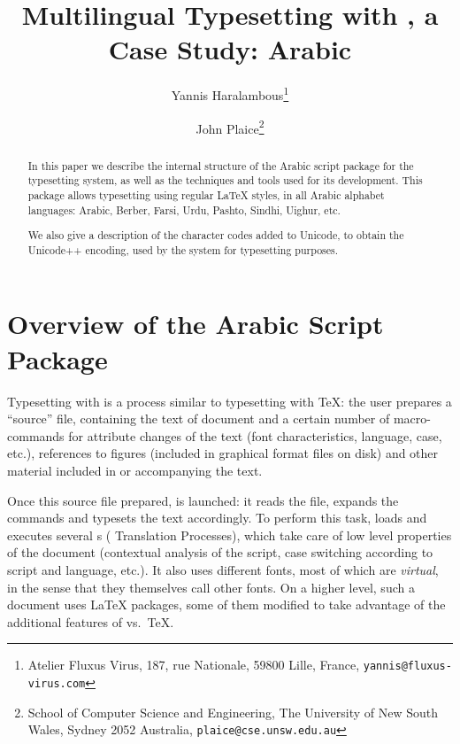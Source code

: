\documentclass[a4paper,11pt]{article}
\begin{document}
\setcounter{page}{63}
\title{Multilingual Typesetting with \OMEGA, a Case Study: Arabic}
\author{Yannis Haralambous\thanks{Atelier Fluxus Virus, 187, rue Nationale,
59800 Lille, France, \texttt{yannis@fluxus-virus.com}}
\and
John Plaice\thanks{School of Computer Science and Engineering,
The University of New South Wales, Sydney 2052 Australia,
\texttt{plaice@cse.unsw.edu.au}}
}
\date{}
\maketitle
\begin{abstract}
In this paper we describe the internal structure of the Arabic script
package for the \OMEGA{} typesetting system, as well as the techniques
and tools used for its development. This package allows typesetting
using regular \LaTeX{} styles, in all Arabic alphabet languages:
Arabic, Berber, Farsi, Urdu, Pashto, Sindhi, Uighur, etc.

We also give a description of the character codes added to Unicode, to
obtain the Unicode++ encoding, used by the \OMEGA{} system for
typesetting purposes.
\end{abstract}

\section{Overview of the \OMEGA{} Arabic Script Package}

Typesetting with \OMEGA{} is a process similar to typesetting with
\TeX: the user prepares a ``source'' file, containing the text of
\hisher{} document and a certain number of macro-commands for
attribute changes of the text (font characteristics, language, case,
etc.), references to figures (included in graphical format files on
disk) and other material included in or accompanying the text.

Once this source file prepared, \OMEGA{} is launched: it reads the
file, expands the commands and typesets the text accordingly. To
perform this task, \OMEGA{} loads and executes several \OTP{}s
(\OMEGA{} Translation Processes), which take care of low level
properties of the document (contextual analysis of the script, case
switching according to script and language, etc.). It also uses
different fonts, most of which are \emph{virtual}, in the sense that
they themselves call other fonts. On a higher level, such a document
uses \LaTeX{} packages, some of them modified to take advantage of the
additional features of \OMEGA{} vs.\ \TeX.
\end{document}
